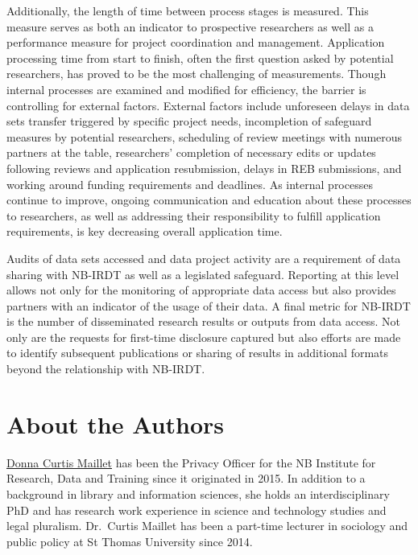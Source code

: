 Additionally, the length of time between process stages is measured. This measure serves as both an indicator to prospective researchers as well as a performance measure for project coordination and management. Application processing time from start to finish, often the first question asked by potential researchers, has proved to be the most challenging of measurements. Though internal processes are examined and modified for efficiency, the barrier is controlling for external factors. External factors include unforeseen delays in data sets transfer triggered by specific project needs, incompletion of safeguard measures by potential researchers, scheduling of review meetings with numerous partners at the table, researchers' completion of necessary edits or updates following reviews and application resubmission, delays in REB submissions, and working around funding requirements and deadlines. As internal processes continue to improve, ongoing communication and education about these processes to researchers, as well as addressing their responsibility to fulfill application requirements, is key decreasing overall application time.

Audits of data sets accessed and data project activity are a requirement of data sharing with NB-IRDT as well as a legislated safeguard. Reporting at this level allows not only for the monitoring of appropriate data access but also provides partners with an indicator of the usage of their data. A final metric for NB-IRDT is the number of disseminated research results or outputs from data access. Not only are the requests for first-time disclosure captured but also efforts are made to identify subsequent publications or sharing of results in additional formats beyond the relationship with NB-IRDT.

\hypertarget{about-the-authors-3}{%
\section*{About the Authors}\label{about-the-authors-3}}

\href{https://www.unb.ca/faculty-staff/directory/nbirdt/curtis-maillet-donna.html}{Donna Curtis Maillet} has been the Privacy Officer for the NB Institute for Research, Data and Training since it originated in 2015. In addition to a background in library and information sciences, she holds an interdisciplinary PhD and has research work experience in science and technology studies and legal pluralism. Dr.~Curtis Maillet has been a part-time lecturer in sociology and public policy at St Thomas University since 2014.

